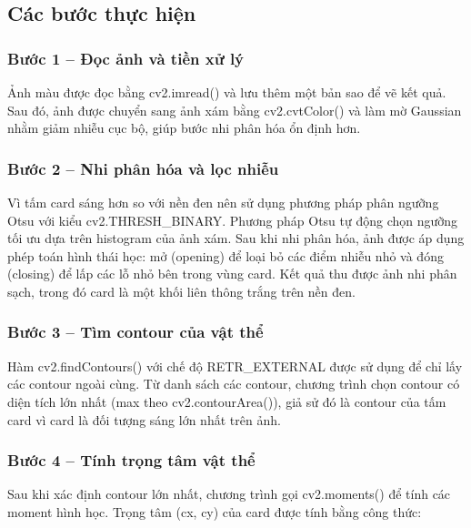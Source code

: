     \subsection{Các bước thực hiện}

        \subsubsection{Bước 1 – Đọc ảnh và tiền xử lý}

            \hspace*{0.6cm}Ảnh màu được đọc bằng cv2.imread() và lưu thêm một bản sao để vẽ kết quả. Sau đó, ảnh được chuyển sang ảnh xám bằng cv2.cvtColor() và làm mờ Gaussian nhằm giảm nhiễu cục bộ, giúp bước nhi phân hóa ổn định hơn.

        \subsubsection{Bước 2 – Nhi phân hóa và lọc nhiễu}

            \hspace*{0.6cm}Vì tấm card sáng hơn so với nền đen nên sử dụng phương pháp phân ngưỡng Otsu với kiểu cv2.THRESH\_BINARY. Phương pháp Otsu tự động chọn ngưỡng tối ưu dựa trên histogram của ảnh xám. Sau khi nhi phân hóa, ảnh được áp dụng phép toán hình thái học: mở (opening) để loại bỏ các điểm nhiễu nhỏ và đóng (closing) để lấp các lỗ nhỏ bên trong vùng card. Kết quả thu được ảnh nhi phân sạch, trong đó card là một khối liên thông trắng trên nền đen.

        \subsubsection{Bước 3 – Tìm contour của vật thể}

            \hspace*{0.6cm}Hàm cv2.findContours() với chế độ RETR\_EXTERNAL được sử dụng để chỉ lấy các contour ngoài cùng. Từ danh sách các contour, chương trình chọn contour có diện tích lớn nhất (max theo cv2.contourArea()), giả sử đó là contour của tấm card vì card là đối tượng sáng lớn nhất trên ảnh.

        \subsubsection{Bước 4 – Tính trọng tâm vật thể}

            \hspace*{0.6cm}Sau khi xác định contour lớn nhất, chương trình gọi cv2.moments() để tính các moment hình học. Trọng tâm (cx, cy) của card được tính bằng công thức:

